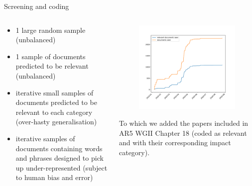 \documentclass[9pt]{beamer}
\begin{document}
\begin{frame}{Screening and coding}

\begin{columns}
	\begin{column}{0.382\linewidth}
		\begin{itemize}
			\item 1 large random sample (unbalanced)
			\item 1 sample of documents predicted to be relevant (unbalanced)
			\item iterative small samples of documents predicted to be relevant to each category (over-hasty generalisation)
			\item iterative samples of documents containing words and phrases designed to pick up under-represented (subject to human bias and error)
		\end{itemize}
	\end{column}
	\begin{column}{0.618\linewidth}
		\begin{figure}
			\includegraphics[width=\linewidth]{../plots/progress/docs_time.pdf}
		\end{figure}
	
	\medskip 
	
	To which we added the papers included in AR5 WGII Chapter 18 (coded as relevant and with their corresponding impact category).
	\end{column}
\end{columns}



\end{frame}
\end{document}
